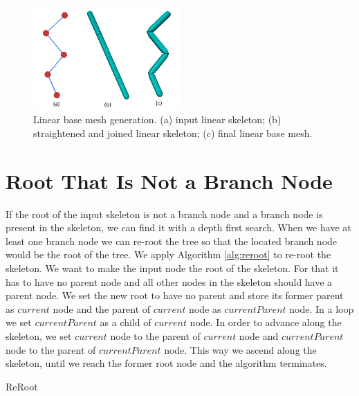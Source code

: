 \begin{figure}[ht]
    \centering
    \includegraphics[width=0.5\textwidth]{images/worm_generation}
    \caption[Linear base mesh]{Linear base mesh generation. (a) input linear skeleton; (b) straightened and joined linear skeleton; (c) final linear base mesh.}
    \label{fig:worm_ilu}
\end{figure}

\section{Root That Is Not a Branch Node}
If the root of the input skeleton is not a branch node and a branch node is present in the skeleton, we can find it with a depth first search.
When we have at least one branch node we can re-root the tree so that the located branch node would be the root of the tree.
We apply Algorithm \ref{alg:reroot} to re-root the skeleton.
We want to make the input node the root of the skeleton.
For that it has to have no parent node and all other nodes in the skeleton should have a parent node.
We set the new root to have no parent and store its former parent as $current$ node and the parent of $current$ node as $currentParent$ node.
In a loop we set $currentParent$ as a child of $current$ node.
In order to advance along the skeleton, we set $current$ node to the parent of $current$ node and $currentParent$ node to the parent of $currentParent$ node.
This way we ascend along the skeleton, until we reach the former root node and the algorithm terminates.
\begin{algorithm}[h]
\caption{ReRoot}
\label{alg:reroot}
\begin{algorithmic}

	\ENDWHILE
\end{algorithmic}
\end{algorithm}

